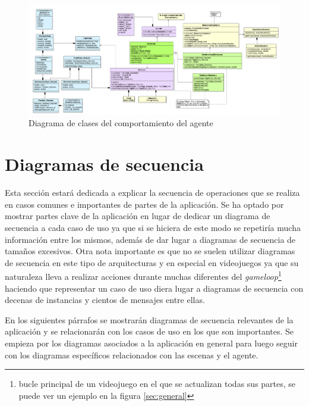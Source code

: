 \clearpage
\begin{landscape}
\begin{figure}
	\begin{adjustwidth}{-3cm}{}
		\includegraphics[width=24cm]{otros/UML/png/alld/png/gamelogic__gameplay__characterAI__diagramaDeClases_IA_5.png}
		\caption{Diagrama de clases del comportamiento del agente}
		\label{class:agent}
	\end{adjustwidth}
\end{figure}
\end{landscape}
\clearpage



\section{Diagramas de secuencia}

Esta sección estará dedicada a explicar la secuencia de operaciones que se realiza en casos comunes e importantes de partes de la aplicación. Se ha optado por mostrar partes clave de la aplicación en lugar de dedicar un diagrama de secuencia a cada caso de uso ya que si se hiciera de este modo se repetiría mucha información entre los mismos, además de dar lugar a diagramas de secuencia de tamaños excesivos. Otra nota importante es que no se suelen utilizar diagramas de secuencia en este tipo de arquitecturas y en especial en videojuegos ya que su naturaleza lleva a realizar acciones durante muchas diferentes del \textit{gameloop}\footnote{bucle principal de un videojuego en el que se actualizan todas sus partes, se puede ver un ejemplo en la figura \ref{sec:general}} haciendo que representar un caso de uso diera lugar a diagramas de secuencia con decenas de instancias y cientos de mensajes entre ellas.

\bigskip

En los siguientes párrafos se mostrarán diagramas de secuencia relevantes de la aplicación y se relacionarán con los casos de uso en los que son importantes. Se empieza por los diagramas asociados a la aplicación en general para luego seguir con los diagramas específicos relacionados con las escenas y el agente.

